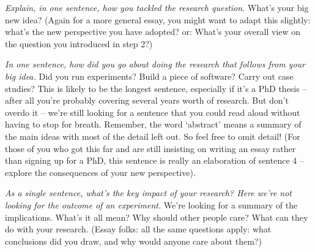 \documentclass[
  numbers=noenddot,
  english,  %
  a4paper,  %
  twoside,  %
  bibliography=totoc,
  headsepline,
  cleardoublepage=empty,
  parskip=half,
  draft=false
]{scrbook}
\theoremstyle{break}
\begin{document}
\emph{Explain, in one sentence, how you tackled the research question.}
What’s your big new idea?
(Again for a more general essay, you might want to adapt this slightly: what’s the new perspective you have adopted? or:
What’s your overall view on the question you introduced in step 2?)

\emph{In one sentence, how did you go about doing the research that follows from your big idea.}
Did you run experiments?
Build a piece of software?
Carry out case studies?
This is likely to be the longest sentence, especially if it’s a PhD thesis – after all you’re probably covering several years worth of research.
But don’t overdo it – we’re still looking for a sentence that you could read aloud without having to stop for breath.
Remember, the word ‘abstract’ means a summary of the main ideas with most of the detail left out.
So feel free to omit detail!
(For those of you who got this far and are still insisting on writing an essay rather than signing up for a PhD, this sentence is really an elaboration of sentence 4 – explore the consequences of your new perspective).

\emph{As a single sentence, what’s the key impact of your research?
  Here we’re not looking for the outcome of an experiment.
}
We’re looking for a summary of the implications.
What’s it all mean?
Why should other people care?
What can they do with your research.
(Essay folks: all the same questions apply: what conclusions did you draw, and why would anyone care about them?)



%
%
\tableofcontents

\listoffigures

\listoftables
\listoflistings

\end{document}
